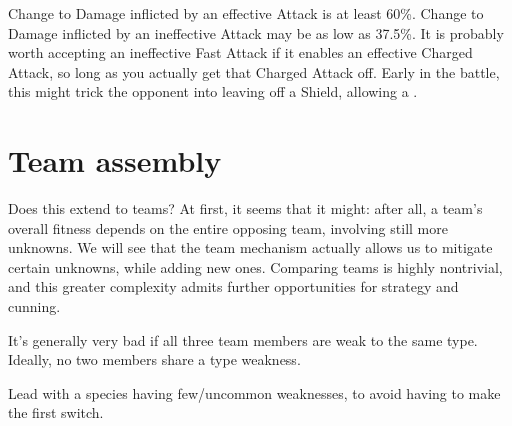 Change to Damage inflicted by an effective Attack is at least 60\%.
Change to Damage inflicted by an ineffective Attack may be as
 low as 37.5\%.
It is probably worth accepting an ineffective Fast Attack if it
 enables an effective Charged Attack, so long as you actually
 get that Charged Attack off.
Early in the battle, this might trick the opponent into leaving
 off a Shield, allowing a .

\section{Team assembly}
Does this extend to teams?
At first, it seems that it might: after all, a team's overall fitness
 depends on the entire opposing team, involving still more unknowns.
We will see that the team mechanism actually allows us to mitigate certain
 unknowns, while adding new ones.
Comparing teams is highly nontrivial, and this greater complexity admits
 further opportunities for strategy and cunning.

It's generally very bad if all three team members are weak to the same type.
Ideally, no two members share a type weakness.

Lead with a species having few/uncommon weaknesses, to avoid having to make the
  first switch.

